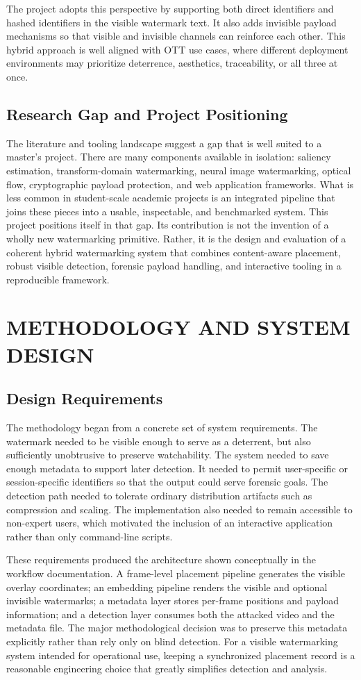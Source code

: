 \documentclass[12pt,oneside]{report}
\begin{document}
The project adopts this perspective by supporting both direct identifiers and hashed identifiers in the visible watermark text. It also adds invisible payload mechanisms so that visible and invisible channels can reinforce each other. This hybrid approach is well aligned with OTT use cases, where different deployment environments may prioritize deterrence, aesthetics, traceability, or all three at once.

\section{Research Gap and Project Positioning}
The literature and tooling landscape suggest a gap that is well suited to a master's project. There are many components available in isolation: saliency estimation, transform-domain watermarking, neural image watermarking, optical flow, cryptographic payload protection, and web application frameworks. What is less common in student-scale academic projects is an integrated pipeline that joins these pieces into a usable, inspectable, and benchmarked system. This project positions itself in that gap. Its contribution is not the invention of a wholly new watermarking primitive. Rather, it is the design and evaluation of a coherent hybrid watermarking system that combines content-aware placement, robust visible detection, forensic payload handling, and interactive tooling in a reproducible framework.

\clearpage
\chapter{METHODOLOGY AND SYSTEM DESIGN}
\section{Design Requirements}
The methodology began from a concrete set of system requirements. The watermark needed to be visible enough to serve as a deterrent, but also sufficiently unobtrusive to preserve watchability. The system needed to save enough metadata to support later detection. It needed to permit user-specific or session-specific identifiers so that the output could serve forensic goals. The detection path needed to tolerate ordinary distribution artifacts such as compression and scaling. The implementation also needed to remain accessible to non-expert users, which motivated the inclusion of an interactive application rather than only command-line scripts.

These requirements produced the architecture shown conceptually in the workflow documentation. A frame-level placement pipeline generates the visible overlay coordinates; an embedding pipeline renders the visible and optional invisible watermarks; a metadata layer stores per-frame positions and payload information; and a detection layer consumes both the attacked video and the metadata file. The major methodological decision was to preserve this metadata explicitly rather than rely only on blind detection. For a visible watermarking system intended for operational use, keeping a synchronized placement record is a reasonable engineering choice that greatly simplifies detection and analysis.
\end{document}
